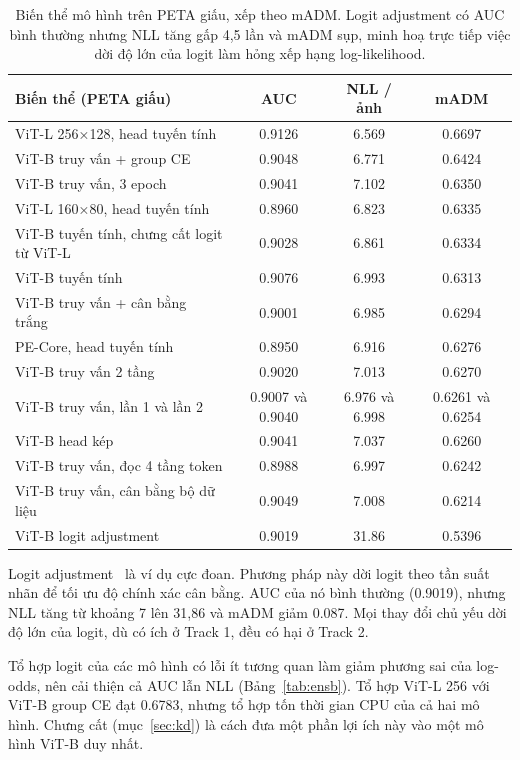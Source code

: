 \documentclass[11pt,a4paper]{article}
\begin{document}
\begin{table}[H]
\centering\small
\begin{tabular}{@{}lccc@{}}
\toprule
Biến thể (PETA giấu) & AUC & NLL / ảnh & mADM \\
\midrule
ViT-L 256×128, head tuyến tính & 0.9126 & 6.569 & 0.6697 \\
ViT-B truy vấn + group CE & 0.9048 & 6.771 & 0.6424 \\
ViT-B truy vấn, 3 epoch & 0.9041 & 7.102 & 0.6350 \\
ViT-L 160×80, head tuyến tính & 0.8960 & 6.823 & 0.6335 \\
ViT-B tuyến tính, chưng cất logit từ ViT-L & 0.9028 & 6.861 & 0.6334 \\
ViT-B tuyến tính & 0.9076 & 6.993 & 0.6313 \\
ViT-B truy vấn + cân bằng trắng & 0.9001 & 6.985 & 0.6294 \\
PE-Core, head tuyến tính & 0.8950 & 6.916 & 0.6276 \\
ViT-B truy vấn 2 tầng & 0.9020 & 7.013 & 0.6270 \\
ViT-B truy vấn, lần 1 và lần 2 & 0.9007 và 0.9040 & 6.976 và 6.998 & 0.6261 và 0.6254 \\
ViT-B head kép & 0.9041 & 7.037 & 0.6260 \\
ViT-B truy vấn, đọc 4 tầng token & 0.8988 & 6.997 & 0.6242 \\
ViT-B truy vấn, cân bằng bộ dữ liệu & 0.9049 & 7.008 & 0.6214 \\
ViT-B logit adjustment & 0.9019 & 31.86 & 0.5396 \\
\bottomrule
\end{tabular}
\caption{Biến thể mô hình trên PETA giấu, xếp theo mADM. Logit adjustment có AUC bình thường nhưng NLL tăng gấp 4,5 lần và mADM sụp, minh hoạ trực tiếp việc dời độ lớn của logit làm hỏng xếp hạng log-likelihood.}
\label{tab:var}
\end{table}

Logit adjustment~\cite{logitadj} là ví dụ cực đoan. Phương pháp này dời logit theo tần suất nhãn để tối ưu độ chính xác cân bằng. AUC của nó bình thường (0.9019), nhưng NLL tăng từ khoảng 7 lên 31,86 và mADM giảm 0.087. Mọi thay đổi chủ yếu dời độ lớn của logit, dù có ích ở Track 1, đều có hại ở Track 2.

Tổ hợp logit của các mô hình có lỗi ít tương quan làm giảm phương sai của log-odds, nên cải thiện cả AUC lẫn NLL (Bảng~\ref{tab:ensb}). Tổ hợp ViT-L 256 với ViT-B group CE đạt 0.6783, nhưng tổ hợp tốn thời gian CPU của cả hai mô hình. Chưng cất (mục~\ref{sec:kd}) là cách đưa một phần lợi ích này vào một mô hình ViT-B duy nhất.
\end{document}
